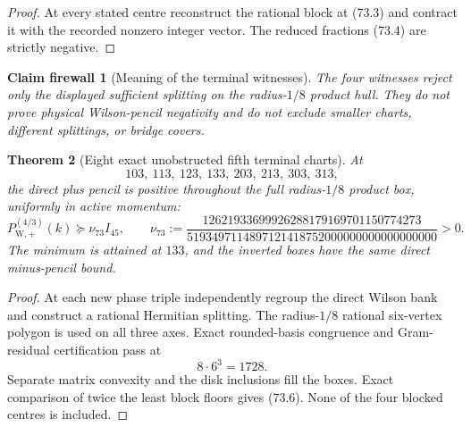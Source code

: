 \documentclass[11pt,oneside]{article}
\newtheorem{theorem}{Theorem}[section]
\newtheorem{firewall}[theorem]{Claim firewall}
\theoremstyle{definition}
\theoremstyle{remark}
\begin{document}
\begin{proof}
At every stated centre reconstruct the rational block at (73.3)
and contract it with the recorded nonzero integer vector.  The
reduced fractions (73.4) are strictly negative.
\end{proof}

\begin{firewall}[Meaning of the terminal witnesses]
\label{fire:newv73-witness-meaning}
The four witnesses reject only the displayed sufficient splitting
on the radius-\(1/8\) product hull.  They do not prove physical
Wilson-pencil negativity and do not exclude smaller charts,
different splittings, or bridge covers.
\end{firewall}

\begin{theorem}[Eight exact unobstructed fifth terminal charts]
\label{thm:newv73-eight-charts}
At
\[
 103,\ 113,\ 123,\ 133,\ 203,\ 213,\ 303,\ 313,       \tag{73.5}
\]
the direct plus pencil is positive throughout the full
radius-\(1/8\) product box, uniformly in active momentum:
\[
 P_{\mathrm W,+}^{(4/3)}(k)
 \succeq\nu_{73}I_{45},\qquad
 \nu_{73}:=
 \frac{12621933699926288179169701150774273}
 {5193497114897121418752000000000000000000}>0.        \tag{73.6}
\]
The minimum is attained at \(133\), and the inverted boxes have the
same direct minus-pencil bound.
\end{theorem}

\begin{proof}
At each new phase triple independently regroup the direct Wilson
bank and construct a rational Hermitian splitting.  The
radius-\(1/8\) rational six-vertex polygon is used on all three
axes.  Exact rounded-basis congruence and Gram-residual
certification pass at
\[
 8\cdot6^3=1728.                                      \tag{73.7}
\]
Separate matrix convexity and the disk inclusions fill the boxes.
Exact comparison of twice the least block floors gives (73.6).
None of the four blocked centres is included.
\end{proof}
\end{document}
